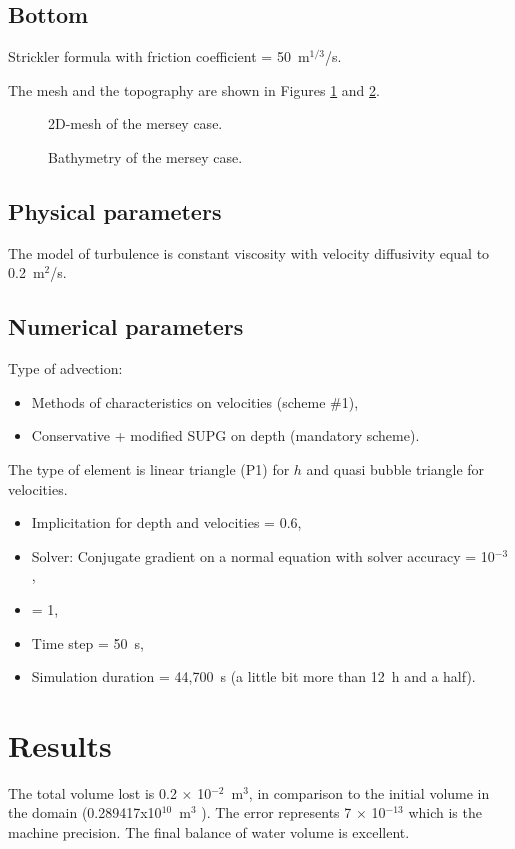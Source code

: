 \subsection{Bottom}
Strickler formula with friction coefficient = 50~m$^{1/3}$/s.

The mesh and the topography are shown in Figures \ref{fig:mersey:Mesh} and
\ref{fig:mersey:Bathy}.

\begin{figure}[H]
 \centering
  \caption{2D-mesh of the mersey case.}\label{fig:mersey:Mesh}
\end{figure}


\begin{figure}[H]
 \centering
  \caption{Bathymetry of the mersey case.}\label{fig:mersey:Bathy}
\end{figure}

\subsection{Physical parameters}
The model of turbulence is constant viscosity
with velocity diffusivity  equal to 0.2~m$^2$/s.

\subsection{Numerical parameters}
Type of advection:
\begin{itemize}
\item Methods of characteristics on velocities (scheme \#1),
\item Conservative + modified SUPG on depth (mandatory scheme).
\end{itemize}
The type of element is linear triangle (P1) for $h$ and quasi bubble triangle
for velocities.
\begin{itemize}
\item Implicitation for depth and velocities = 0.6,
\item Solver: Conjugate gradient on a normal equation with solver accuracy = 10$^{-3}$,
\item {} = 1,
\item Time step = 50~s,
\item Simulation duration = 44,700~s (a little bit more than 12~h and a half).
\end{itemize}

\section{Results}
The total volume lost is 0.2 $\times$ 10$^{-2}$~m$^3$, in comparison to the
initial volume in the domain (0.289417x10$^{10}$~m$^3$ ).
The error represents 7 $\times$ 10$^{-13}$ which is the machine precision.
The final balance of water volume is excellent.

